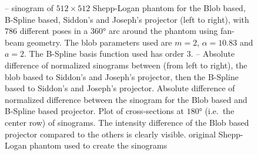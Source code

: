 \begin{figure}
	\caption{-- sinogram of \(512 \times
		512\) Shepp-Logan phantom for the Blob based, B-Spline based, Siddon's and Joseph's
		projector (left to right), with \(786\) different poses in a \(360\)° arc around the
		phantom using fan-beam geometry. The blob parameters used are \(m=2\),
		\(\alpha=10.83\) and \(a=2\). The B-Spline basis function used has order \(3\).%
		-- Absolute
		difference of normalized sinograms between (from left to right), the blob based to
		Siddon's and Joseph's projector, then the B-Spline based to Siddon's and Joseph's
		projector.  Absolute difference of normalized
		difference between the sinogram for the Blob based and B-Spline based projector.%
		 Plot of cross-sections at \(180\)° (i.e.\ the
		center row) of sinograms. The intensity difference of the Blob based projector
		compared to the others is clearly visible. 
		original Shepp-Logan phantom used to create the sinograms}%
	\label{fig:sinogram_shepp_logan}
\end{figure}

